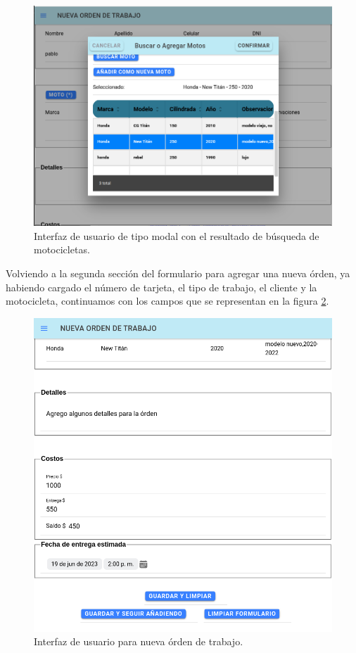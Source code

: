 \begin{figure}[H]
	\centering
	\includegraphics[scale=.30]{./Figures/nueva-moto-2.png}
	\caption{Interfaz de usuario de tipo modal con el resultado de búsqueda de motocicletas.}
	\label{fig:nuevamoto2}
\end{figure}

Volviendo a la segunda sección del formulario para agregar una nueva órden, ya habiendo cargado el número de tarjeta, el tipo de trabajo, el cliente y la motocicleta, continuamos con los campos que se representan en la figura \ref{fig:nuevafull2}.

 
\begin{figure}[H]
	\centering
	\includegraphics[scale=.30]{./Figures/nueva-full-2.png}
	\caption{Interfaz de usuario para nueva órden de trabajo.}
	\label{fig:nuevafull2}
\end{figure}

